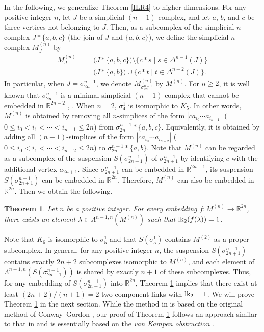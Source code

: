 \documentclass{amsart}
\newtheorem{Theorem}{Theorem}[section]
\theoremstyle{definition}
\theoremstyle{remark}
\numberwithin{equation}{section}
\begin{document}
In the following, we generalize Theorem \ref{ILR4} to higher dimensions. For any positive integer $n$, let $J$ be a simplicial $(n-1)$-complex, and let $a$, $b$, and $c$ be three vertices not belonging to $J$. Then, as a subcomplex of the simplicial $n$-complex $J * \{a,b,c\}$ (the join of $J$ and $\{a,b,c\}$), we define the simplicial $n$-complex $M_J^{(n)}$ by
\begin{eqnarray*}
M_{J}^{(n)} 
&=& \bigl( J * \{a,b,c\} \bigr) \setminus \{ c * s \mid s \in \varDelta^{n-1}(J) \} \\
&=& \bigl( J * \{a,b\} \bigr) \cup \bigl\{ c * t \mid t \in \varDelta^{n-2}(J) \bigr\}.
\end{eqnarray*}
In particular, when $J = \sigma_{2n}^{n-1}$, we denote $M_{\sigma_{2n}^{n-1}}^{(n)}$ by $M^{(n)}$. For $n \ge 2$, it is well known that $\sigma_{2n}^{n-1}$ is a minimal simplicial $(n-1)$-complex that cannot be embedded in $\mathbb{R}^{2n-2}$ \cite{VK33}, \cite{Flores32}. When $n=2$, $\sigma_4^1$ is isomorphic to $K_5$. In other words, $M^{(n)}$ is obtained by removing all $n$-simplices of the form $|c a_{i_0} \cdots a_{i_{n-1}}|$ ($0 \le i_0 < i_1 < \cdots < i_{n-1} \le 2n$) from $\sigma_{2n}^{n-1} * \{a,b,c\}$. Equivalently, it is obtained by adding all $(n-1)$-simplices of the form $|c a_{i_0} \cdots a_{i_{n-2}}|$ ($0 \le i_0 < i_1 < \cdots < i_{n-2} \le 2n$) to $\sigma_{2n}^{n-1} * \{a,b\}$. Note that $M^{(n)}$ can be regarded as a subcomplex of the suspension $S(\sigma_{2n+1}^{n-1})$ of $\sigma_{2n+1}^{n-1}$ by identifying $c$ with the additional vertex $a_{2n+1}$. Since $\sigma_{2n+1}^{n-1}$ can be embedded in $\mathbb{R}^{2n-1}$, its suspension $S(\sigma_{2n+1}^{n-1})$ can be embedded in $\mathbb{R}^{2n}$. Therefore, $M^{(n)}$ can also be embedded in $\mathbb{R}^{2n}$. Then we obtain the following.



\begin{Theorem}\label{ILR2n} 
Let $n$ be a positive integer. For every embedding $f \colon M^{(n)} \to \mathbb{R}^{2n}$, there exists an element $\lambda \in \Lambda^{n-1,n}(M^{(n)})$ such that ${\rm lk}_2(f(\lambda)) = 1$. 
\end{Theorem}

Note that $K_6$ is isomorphic to $\sigma_5^1$ and that $S(\sigma_5^1)$ contains $M^{(2)}$ as a proper subcomplex. In general, for any positive integer $n$, the suspension $S(\sigma_{2n+1}^{n-1})$ contains exactly $2n+2$ subcomplexes isomorphic to $M^{(n)}$, and each element of $\Lambda^{n-1,n}(S(\sigma_{2n+1}^{n-1}))$ is shared by exactly $n+1$ of these subcomplexes. Thus, for any embedding of $S(\sigma_{2n+1}^{n-1})$ into $\mathbb{R}^{2n}$, Theorem \ref{ILR2n} implies that there exist at least $(2n+2)/(n+1) = 2$ two-component links with ${\rm lk}_2 = 1$. We will prove Theorem \ref{ILR2n} in the next section. While the method in \cite{HRJV26} is based on the original method of Conway--Gordon \cite{CG83}, our proof of Theorem \ref{ILR2n} follows an approach similar to that in \cite{N26b} and is essentially based on the \textit{van Kampen obstruction} \cite{VK33}.
\end{document}
